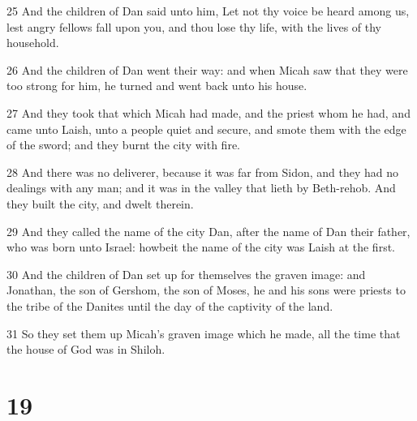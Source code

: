 \par 25 And the children of Dan said unto him, Let not thy voice be heard among us, lest angry fellows fall upon you, and thou lose thy life, with the lives of thy household.
\par 26 And the children of Dan went their way: and when Micah saw that they were too strong for him, he turned and went back unto his house.
\par 27 And they took that which Micah had made, and the priest whom he had, and came unto Laish, unto a people quiet and secure, and smote them with the edge of the sword; and they burnt the city with fire.
\par 28 And there was no deliverer, because it was far from Sidon, and they had no dealings with any man; and it was in the valley that lieth by Beth-rehob. And they built the city, and dwelt therein.
\par 29 And they called the name of the city Dan, after the name of Dan their father, who was born unto Israel: howbeit the name of the city was Laish at the first.
\par 30 And the children of Dan set up for themselves the graven image: and Jonathan, the son of Gershom, the son of Moses, he and his sons were priests to the tribe of the Danites until the day of the captivity of the land.
\par 31 So they set them up Micah's graven image which he made, all the time that the house of God was in Shiloh.

\chapter{19}

